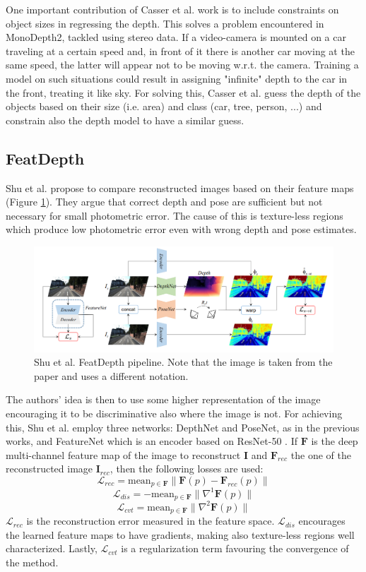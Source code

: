 One important contribution of Casser et al. work is to include constraints on object sizes in regressing the depth.
This solves a problem encountered in MonoDepth2, tackled using stereo data.
If a video-camera is mounted on a car traveling at a certain speed and, in front of it there is another car moving at the same speed, the latter will appear not to be moving w.r.t. the camera.
Training a model on such situations could result in assigning "infinite" depth to the car in the front, treating it like sky.
For solving this, Casser et al. guess the depth of the objects based on their size (i.e. area) and class (car, tree, person, ...) and constrain also the depth model to have a similar guess.

\subsection{FeatDepth}
Shu et al. \cite{FeatDepth} propose to compare reconstructed images based on their feature maps (Figure \ref{fig:featdepth}).
They argue that correct depth and pose are sufficient but not necessary for small photometric error.
The cause of this is texture-less regions which produce low photometric error even with wrong depth and pose estimates.
\begin{figure}
	\centering
	\includegraphics[scale=0.3]{figs/featdepth}
	\caption{Shu et al. FeatDepth \cite{FeatDepth} pipeline. Note that the image is taken from the paper and uses a different notation. \label{fig:featdepth}}
\end{figure}
The authors' idea is then to use some higher representation of the image encouraging it to be discriminative also where the image is not.
For achieving this, Shu et al. employ three networks: DepthNet and PoseNet, as in the previous works, and FeatureNet which is an encoder based on ResNet-50 \cite{ResNet}.
If $\mathbf{F}$ is the deep multi-channel feature map of the image to reconstruct $\mathbf{I}$ and $\mathbf{F}_{rec}$ the one of the reconstructed image $\mathbf{I}_{rec}$, then the following losses are used:
\[
	\mathcal{L}_{rec} = \text{mean}_{p \in \mathbf{F}} \big\| \mathbf{F}(p) - \mathbf{F}_{rec}(p) \big\|
\] \[
	\mathcal{L}_{dis} = - \text{mean}_{p \in \mathbf{F}} \big\| \nabla^{1} \mathbf{F}(p) \big\|
\] \[
	\mathcal{L}_{cvt} = \text{mean}_{p \in \mathbf{F}} \big\| \nabla^{2} \mathbf{F}(p) \big\|
\]
$\mathcal{L}_{rec}$ is the reconstruction error measured in the feature space.
$\mathcal{L}_{dis}$ encourages the learned feature maps to have gradients, making also texture-less regions well characterized.
Lastly, $\mathcal{L}_{cvt}$ is a regularization term favouring the convergence of the method.

